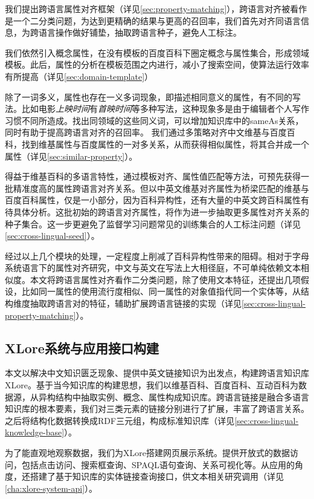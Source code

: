 我们提出跨语言属性对齐框架（详见\ref{sec:property-matching}），跨语言对齐被看作是一个二分类问题，为达到更精确的结果与更高的召回率，我们首先对齐同语言信息，为跨语言操作做好铺垫，抽取跨语言种子，避免人工标注。

我们依然引入概念属性，在没有模板的百度百科下圈定概念与属性集合，形成领域模板。此后，属性的分析在模板范围之内进行，减小了搜索空间，使算法运行效率有所提高（详见\ref{sec:domain-template}）

除了一词多义，属性也存在一义多词现象，即描述相同意义的属性，有不同的写法。比如电影\textit{上映时间}有\textit{首映时间}等多种写法，这种现象多是由于编辑者个人写作习惯不同所造成。找出同领域的这些同义词，可以增加知识库中的sameAs关系，同时有助于提高跨语言对齐的召回率。
我们通过多策略对齐中文维基与百度百科，找到维基属性与百度属性的一对多关系，从而获得相似属性，将其合并成一个属性（详见\ref{sec:similar-property}）。

得益于维基百科的多语言特性，通过模板对齐、属性值匹配等方法，可预先获得一批精准度高的属性跨语言对齐关系。但以中英文维基对齐属性为桥梁匹配的维基与百度百科属性，仅是一小部分，因为百科异构性，还有大量的中英文跨百科属性有待具体分析。这批初始的跨语言对齐属性，将作为进一步抽取更多属性对齐关系的种子集合。这一步更避免了监督学习问题常见的训练集合的人工标注问题（详见\ref{sec:cross-lingual-seed}）。

经过以上几个模块的处理，一定程度上削减了百科异构性带来的阻碍。相对于字母系统语言下的属性对齐研究，中文与英文在写法上大相径庭，不可单纯依赖文本相似度。本文将跨语言属性对齐看作二分类问题，除了使用文本特征，还提出几项假设，比如同一属性的使用流行度相似、同一属性的对象值指代同一个实体等，从结构维度抽取跨语言对的特征，辅助扩展跨语言链接的实现（详见\ref{sec:cross-lingual-property-matching}）。

\subsection{XLore系统与应用接口构建}
本文以解决中文知识匮乏现象、提供中英文链接知识为出发点，构建跨语言知识库XLore。基于当今知识库的构建思想，我们以维基百科、百度百科、互动百科为数据源，从异构结构中抽取实例、概念、属性构成知识库。跨语言链接是融合多语言知识库的根本要素，我们对三类元素的链接分别进行了扩展，丰富了跨语言关系。 
之后将结构化数据转换成RDF三元组，构成标准知识库（详见\ref{sec:cross-lingual-knowledge-base}）。

为了能直观地观察数据，我们为XLore搭建网页展示系统。提供开放式的数据访问，包括点击访问、搜索框查询、SPAQL语句查询、关系可视化等。从应用的角度，还搭建了基于知识库的实体链接查询接口，供文本相关研究调用（详见\ref{cha:xlore-system-api}）。

